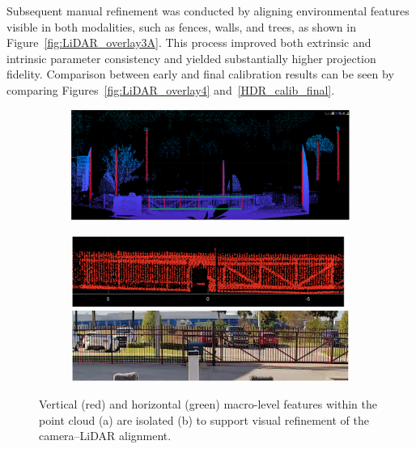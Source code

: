 \documentclass{erauthesis}
\begin{document}
Subsequent manual refinement was conducted by aligning environmental features visible in both modalities, such as fences, walls, and trees, as shown in Figure~\ref{fig:LiDAR_overlay3A}.  
This process improved both extrinsic and intrinsic parameter consistency and yielded substantially higher projection fidelity.  
Comparison between early and final calibration results can be seen by comparing Figures~\ref{fig:LiDAR_overlay4} and~\ref{HDR_calib_final}.

\begin{figure}[htp]
\begin{subfigure}{\textwidth}
\centering
\includegraphics[width=0.94\linewidth]{Images/LiDAR_features.png}
    \caption{}
\end{subfigure}
\bigskip
\begin{subfigure}{\textwidth}
\centering
\includegraphics[width=0.94\linewidth]{Images/LiDAR_calib_fence.png}
    \caption{}
\end{subfigure}
\caption{Vertical (red) and horizontal (green) macro-level features within the point cloud (a) are isolated (b) to support visual refinement of the camera–LiDAR alignment.}
\end{figure}
\end{document}
